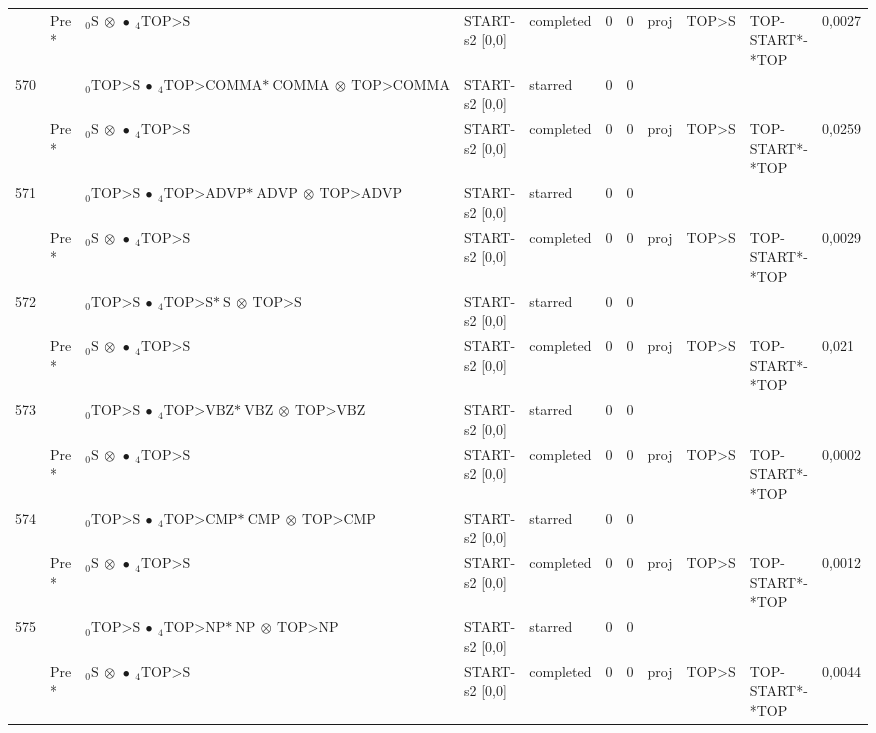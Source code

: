 \documentclass[10pt]{article}
\begin{document}
\begin{longtable}[htbp]{lllllllllll}
 & Pre *& $ {}_0 \textrm{S} \  \otimes \  \bullet \ {}_{4} \textrm{TOP>S} $ & START-s2 [0,0] & completed & 0 & 0 & proj & TOP>S & TOP-START*-*TOP & 0,0027 \\ 
570 & & $ {}_0 \textrm{TOP>S} \  \bullet \ {}_{4} \textrm{TOP>COMMA*} \ \textrm{COMMA} \  \otimes \ \textrm{TOP>COMMA} $ & START-s2 [0,0] & starred & 0 & 0 & & & & \\ 
 & Pre *& $ {}_0 \textrm{S} \  \otimes \  \bullet \ {}_{4} \textrm{TOP>S} $ & START-s2 [0,0] & completed & 0 & 0 & proj & TOP>S & TOP-START*-*TOP & 0,0259 \\ 
571 & & $ {}_0 \textrm{TOP>S} \  \bullet \ {}_{4} \textrm{TOP>ADVP*} \ \textrm{ADVP} \  \otimes \ \textrm{TOP>ADVP} $ & START-s2 [0,0] & starred & 0 & 0 & & & & \\ 
 & Pre *& $ {}_0 \textrm{S} \  \otimes \  \bullet \ {}_{4} \textrm{TOP>S} $ & START-s2 [0,0] & completed & 0 & 0 & proj & TOP>S & TOP-START*-*TOP & 0,0029 \\ 
572 & & $ {}_0 \textrm{TOP>S} \  \bullet \ {}_{4} \textrm{TOP>S*} \ \textrm{S} \  \otimes \ \textrm{TOP>S} $ & START-s2 [0,0] & starred & 0 & 0 & & & & \\ 
 & Pre *& $ {}_0 \textrm{S} \  \otimes \  \bullet \ {}_{4} \textrm{TOP>S} $ & START-s2 [0,0] & completed & 0 & 0 & proj & TOP>S & TOP-START*-*TOP & 0,021 \\ 
573 & & $ {}_0 \textrm{TOP>S} \  \bullet \ {}_{4} \textrm{TOP>VBZ*} \ \textrm{VBZ} \  \otimes \ \textrm{TOP>VBZ} $ & START-s2 [0,0] & starred & 0 & 0 & & & & \\ 
 & Pre *& $ {}_0 \textrm{S} \  \otimes \  \bullet \ {}_{4} \textrm{TOP>S} $ & START-s2 [0,0] & completed & 0 & 0 & proj & TOP>S & TOP-START*-*TOP & 0,0002 \\ 
574 & & $ {}_0 \textrm{TOP>S} \  \bullet \ {}_{4} \textrm{TOP>CMP*} \ \textrm{CMP} \  \otimes \ \textrm{TOP>CMP} $ & START-s2 [0,0] & starred & 0 & 0 & & & & \\ 
 & Pre *& $ {}_0 \textrm{S} \  \otimes \  \bullet \ {}_{4} \textrm{TOP>S} $ & START-s2 [0,0] & completed & 0 & 0 & proj & TOP>S & TOP-START*-*TOP & 0,0012 \\ 
575 & & $ {}_0 \textrm{TOP>S} \  \bullet \ {}_{4} \textrm{TOP>NP*} \ \textrm{NP} \  \otimes \ \textrm{TOP>NP} $ & START-s2 [0,0] & starred & 0 & 0 & & & & \\ 
 & Pre *& $ {}_0 \textrm{S} \  \otimes \  \bullet \ {}_{4} \textrm{TOP>S} $ & START-s2 [0,0] & completed & 0 & 0 & proj & TOP>S & TOP-START*-*TOP & 0,0044 \\ 

\end{longtable}
\end{document}
